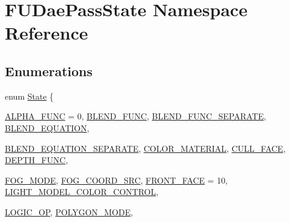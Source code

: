 \hypertarget{namespaceFUDaePassState}{
\section{FUDaePassState Namespace Reference}
\label{namespaceFUDaePassState}
}
\subsection*{Enumerations}
\begin{DoxyCompactItemize}
\item 
enum \hyperlink{namespaceFUDaePassState_a99a648050f80bc29359e932cffa8c973}{State} \{ \par
\hyperlink{namespaceFUDaePassState_a99a648050f80bc29359e932cffa8c973a2206d5d871730ba023a86011293ed9b5}{ALPHA\_\-FUNC} =  0, 
\hyperlink{namespaceFUDaePassState_a99a648050f80bc29359e932cffa8c973a5c30f96ead83aaf455e93bc7700511d0}{BLEND\_\-FUNC}, 
\hyperlink{namespaceFUDaePassState_a99a648050f80bc29359e932cffa8c973a4ac7c1c6fa8482b46aef7a7145a62469}{BLEND\_\-FUNC\_\-SEPARATE}, 
\hyperlink{namespaceFUDaePassState_a99a648050f80bc29359e932cffa8c973a7d27f0a73740d71e29d158ce23769b9c}{BLEND\_\-EQUATION}, 
\par
\hyperlink{namespaceFUDaePassState_a99a648050f80bc29359e932cffa8c973a0f29144111e1f75b4d0467b1b5bef7d1}{BLEND\_\-EQUATION\_\-SEPARATE}, 
\hyperlink{namespaceFUDaePassState_a99a648050f80bc29359e932cffa8c973ac12fdce3ee297e46ffd97601b90d63f7}{COLOR\_\-MATERIAL}, 
\hyperlink{namespaceFUDaePassState_a99a648050f80bc29359e932cffa8c973a0fb9266f46de69c2989c22c9c562034f}{CULL\_\-FACE}, 
\hyperlink{namespaceFUDaePassState_a99a648050f80bc29359e932cffa8c973a7794fa16bb5cd9924849184bf418f7ae}{DEPTH\_\-FUNC}, 
\par
\hyperlink{namespaceFUDaePassState_a99a648050f80bc29359e932cffa8c973a92208e1bd0a151a37665856a11070e69}{FOG\_\-MODE}, 
\hyperlink{namespaceFUDaePassState_a99a648050f80bc29359e932cffa8c973a5be4edeedafa43d6ea45f8a19cecb02c}{FOG\_\-COORD\_\-SRC}, 
\hyperlink{namespaceFUDaePassState_a99a648050f80bc29359e932cffa8c973a20016a957c1412fb206e27b75226b1cf}{FRONT\_\-FACE} =  10, 
\hyperlink{namespaceFUDaePassState_a99a648050f80bc29359e932cffa8c973a6d2c6c898e475286a5534533c2e72356}{LIGHT\_\-MODEL\_\-COLOR\_\-CONTROL}, 
\par
\hyperlink{namespaceFUDaePassState_a99a648050f80bc29359e932cffa8c973afbc241cd7b2dc80fadee9ef253b9d4be}{LOGIC\_\-OP}, 
\hyperlink{namespaceFUDaePassState_a99a648050f80bc29359e932cffa8c973aa0b79e5cbb67f78f9e0ef34b308df91c}{POLYGON\_\-MODE}, 

\end{DoxyCompactItemize}
